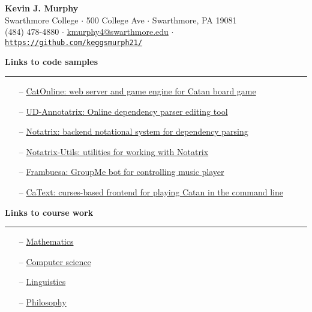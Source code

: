 \documentclass[paper=a4, fontsize=11pt]{scrartcl} %
\newcommand{\I}{--}
\newenvironment{mycenter}[1][\topsep]
  {\setlength{\topsep}{#1}\par\kern\topsep\centering}%
  {\par\kern\topsep}%
\begin{document}
\begin{mycenter}
\textbf{\LARGE Kevin J. Murphy} \\
Swarthmore College $\cdot$ 500 College Ave $\cdot$ Swarthmore, PA 19081 \\
(484) 478-4880 $\cdot$ \href{mailto:kmurphy4@swarthmore.edu}{kmurphy4@swarthmore.edu} $\cdot$ \texttt{\href{https://github.com/keggsmurph21/}{https://github.com/keggsmurph21/}}

\end{mycenter}

{\textbf{Links to code samples}}

\vspace{-3mm}
\rule{\textwidth}{0.4pt}

\begin{itemize}[topsep=0pt,noitemsep]
  \item[\I] \href{https://github.com/keggsmurph21/catonline.git}{CatOnline: web server and game engine for Catan board game}
  \item[\I] \href{https://github.com/jonorthwash/ud-annotatrix.git}{UD-Annotatrix: Online dependency parser editing tool}
  \item[\I] \href{https://github.com/keggsmurph21/notatrix.git}{Notatrix: backend notational system for dependency parsing}
  \item[\I] \href{https://github.com/keggsmurph21/notatrix-utils.git}{Notatrix-Utils: utilities for working with Notatrix}
  \item[\I] \href{https://github.com/keggsmurph21/frambuesa.git}{Frambuesa: GroupMe bot for controlling music player}
  \item[\I] \href{https://github.com/keggsmurph21/catext.git}{CaText: curses-based frontend for playing Catan in the command line}
\end{itemize}

\vspace{2mm}

{\textbf{Links to course work}}

\vspace{-3mm}
\rule{\textwidth}{0.4pt}

\begin{itemize}[topsep=0pt,noitemsep]
  \item[\I] \href{https://github.com/keggsmurph21/swat/tree/master/math/}{Mathematics}
  \item[\I] \href{https://github.com/keggsmurph21/swat/tree/master/cs/}{Computer science}
  \item[\I] \href{https://github.com/keggsmurph21/swat/tree/master/ling/}{Linguistics}
  \item[\I] \href{https://github.com/keggsmurph21/swat/tree/master/philosophy/}{Philosophy}
\end{itemize}

\vspace{2mm}
\end{document}
